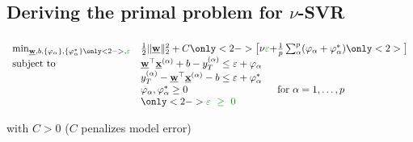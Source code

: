 \subsection{Deriving the primal problem for $\nu$-SVR}

\begin{frame}\frametitle{\subsecname}

\slidesonly{\vspace{-4mm}}

\begin{block}{}
     \begin{equation}
        \begin{array}{ll}
        \min_{\vec w, b,\{\varphi_\alpha\}, \{\varphi_\alpha^*\}\only<2->{, {\color{darkgreen}{\varepsilon}}}} & \frac{1}{2} \lVert \vec w \rVert_{2}^{2} + C \only<2->{\big\lbrack \nu{\color{darkgreen}\varepsilon} + } \frac{1}{p} \sum_{\alpha}^p (\varphi_\alpha + \varphi_\alpha^*) \only<2>{\big\rbrack}\\
        \text{subject to} & 
        \vec w^{\top} \vec x^{(\alpha)} + b - y_{T}^{(\alpha)} \le \varepsilon + \varphi_\alpha\\
        &
        y_{T}^{(\alpha)} - \vec w^{\top} \vec x^{(\alpha)} - b \le \varepsilon + \varphi_\alpha^*\\
        &\varphi_\alpha, \varphi_\alpha^* \ge 0  \qquad\qquad\qquad\qquad\quad \text{for }\alpha=1,\ldots,p \\
        &\only<2->{{\color{darkgreen}\varepsilon~\ge~0}}
        \end{array}
        \label{eq:primalnu}
     \end{equation}
     
     \slidesonly{\vspace{-3mm}}
        with $C>0$ ($C$ penalizes model error)
\end{block}

\pause


     \slidesonly{\vspace{-3mm}}

     \\
     
\pause


\end{frame}
